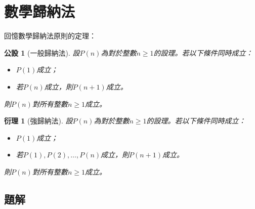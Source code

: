 \documentclass[12pt]{article}
\newtheorem*{corollary}{衍理}
\newtheorem*{axiom}{公設}
\begin{document}
    \section*{數學歸納法}

    回憶數學歸納法原則的定理：

    \begin{axiom}[一般歸納法]
        設$P(n)$為對於整數$n\geq 1$的設理。若以下條件同時成立：\begin{itemize}
            \item $P(1)$成立；
            \item 若$P(n)$成立，則$P(n+1)$成立。
        \end{itemize}
        則$P(n)$對所有整數$n\geq 1$成立。
    \end{axiom}

    \begin{corollary}[強歸納法]
        設$P(n)$為對於整數$n\geq 1$的設理。若以下條件同時成立：\begin{itemize}
            \item $P(1)$成立；
            \item 若$P(1),P(2),\dots,P(n)$成立，則$P(n+1)$成立。
        \end{itemize}
        則$P(n)$對所有整數$n\geq 1$成立。
    \end{corollary}

    \subsection*{題解}
\end{document}
